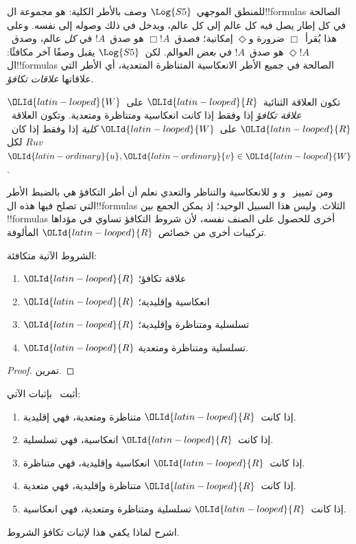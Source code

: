 \documentclass[../../../include/open-logic-section]{subfiles}
\begin{document}


للمنطق الموجهي~$\Log{S5}$ وصف بالأطر الكلية: هو مجموعة
ال!!{formula}s الصالحة في كل إطار يصل فيه كل عالم إلى كل عالم،
ويدخل في ذلك وصوله إلى نفسه. وعلى هذا يُقرأ~$\Box$ ضرورة
و$\Diamond$ إمكانية؛ فصدق~$\Box !A$ هو صدق~$!A$ في \emph{كل}
عالم، وصدق~$\Diamond !A$ هو صدق~$!A$ في \emph{بعض} العوالم.
لكن~$\Log{S5}$ يقبل وصفًا آخر مكافئًا: ال!!{formula}s الصالحة
في جميع الأطر الانعكاسية المتناظرة المتعدية، أي الأطر التي علاقاتها
\emph{علاقات تكافؤ}.

\begin{defn}
  تكون العلاقة الثنائية~${\OLId{latin-looped}{R}}$ على~${\OLId{latin-looped}{W}}$ \emph{علاقة تكافؤ} إذا وفقط إذا
  كانت انعكاسية ومتناظرة ومتعدية. وتكون العلاقة~${\OLId{latin-looped}{R}}$ على~${\OLId{latin-looped}{W}}$
  \emph{كلية} إذا وفقط إذا كان~$Ruv$ لكل~${\OLId{latin-ordinary}{u}},{\OLId{latin-ordinary}{v}} \in {\OLId{latin-looped}{W}}$.
\end{defn}

ومن تمييز~ و و للانعكاسية والتناظر والتعدي
نعلم أن أطر التكافؤ هي بالضبط الأطر التي تصلح فيها هذه
ال!!{formula}s الثلاث. وليس هذا السبيل الوحيد؛ إذ يمكن الجمع
بين !!{formula}s أخرى للحصول على الصنف نفسه، لأن شروط التكافؤ
تساوي في مؤداها تركيبات أخرى من خصائص~${\OLId{latin-looped}{R}}$ المألوفة.

\begin{prop}
  الشروط الآتية متكافئة:
  \begin{enumerate}
  \item ${\OLId{latin-looped}{R}}$ علاقة تكافؤ؛
  \item ${\OLId{latin-looped}{R}}$ انعكاسية وإقليدية؛
  \item ${\OLId{latin-looped}{R}}$ تسلسلية ومتناظرة وإقليدية؛
  \item ${\OLId{latin-looped}{R}}$ تسلسلية ومتناظرة ومتعدية.
  \end{enumerate}
\end{prop}

\begin{proof}
  تمرين.
\end{proof}

\begin{prob}
  أثبت~ بإثبات الآتي:
  \begin{enumerate}
  \item إذا كانت~${\OLId{latin-looped}{R}}$ متناظرة ومتعدية، فهي إقليدية.
  \item إذا كانت~${\OLId{latin-looped}{R}}$ انعكاسية، فهي تسلسلية.
  \item إذا كانت~${\OLId{latin-looped}{R}}$ انعكاسية وإقليدية، فهي متناظرة.
  \item إذا كانت~${\OLId{latin-looped}{R}}$ متناظرة وإقليدية، فهي متعدية.
  \item إذا كانت~${\OLId{latin-looped}{R}}$ تسلسلية ومتناظرة ومتعدية، فهي انعكاسية.
  \end{enumerate}
  اشرح لماذا يكفي هذا لإثبات تكافؤ الشروط.
\end{prob}
\end{document}
